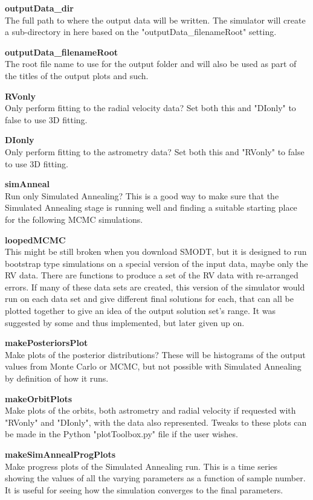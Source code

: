 \documentclass[12pt,preprint]{aastex}
\begin{document}
{\bf outputData\_dir}\\
The full path to where the output data will be written.  The simulator will create a sub-directory in here based on the "outputData\_filenameRoot" setting.

{\bf outputData\_filenameRoot}\\
The root file name to use for the output folder and will also be used as part of the titles of the output plots and such.

{\bf RVonly}\\
Only perform fitting to the radial velocity data?  Set both this and "DIonly" to false to use 3D fitting.

{\bf DIonly}\\
Only perform fitting to the astrometry data?  Set both this and "RVonly" to false to use 3D fitting.

{\bf simAnneal}\\
Run only Simulated Annealing?  This is a good way to make sure that the Simulated Annealing stage is running well and finding a suitable starting place for the following MCMC simulations.

{\bf loopedMCMC}\\
This might be still broken when you download SMODT, but it is designed to run bootstrap type simulations on a special version of the input data, maybe only the RV data.  There are functions to produce a set of the RV data with re-arranged errors.  If many of these data sets are created, this version of the simulator would run on each data set and give different final solutions for each, that can all be plotted together to give an idea of the output solution set's range.  It was suggested by some and thus implemented, but later given up on.

{\bf makePosteriorsPlot}\\
Make plots of the posterior distributions?  These will be histograms of the output values from Monte Carlo or MCMC, but not possible with Simulated Annealing by definition of how it runs.

{\bf makeOrbitPlots}\\
Make plots of the orbits, both astrometry and radial velocity if requested with "RVonly" and "DIonly", with the data also represented.  Tweaks to these plots can be made in the Python "plotToolbox.py" file if the user wishes.

{\bf makeSimAnnealProgPlots}\\
Make progress plots of the Simulated Annealing run.  This is a time series showing the values of all the varying parameters as a function of sample number.  It is useful for seeing how the simulation converges to the final parameters.
\end{document}
